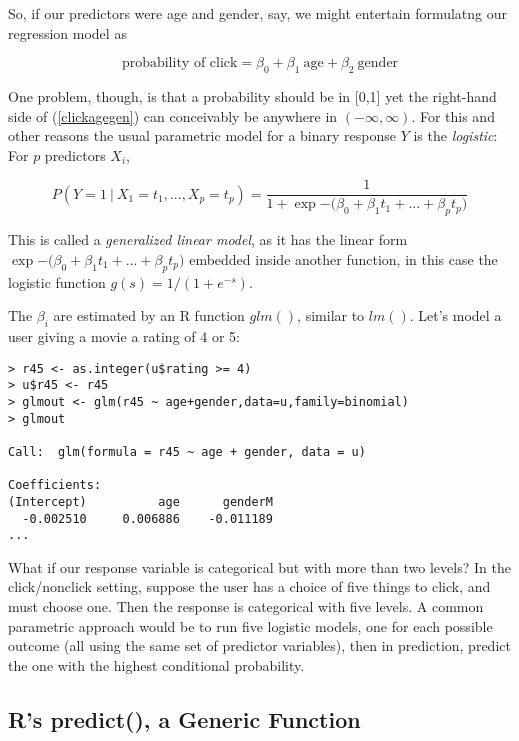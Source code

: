So, if our predictors were age and gender, say, we might entertain
formulatng our regression model as

\begin{equation}
\label{clickagegen}
\textrm{probability of click} = \beta_0 + \beta_1 ~ \textrm{age} +
\beta_2 ~ \textrm{gender}
\end{equation}

One problem, though, is that a probability should be in [0,1] yet the
right-hand side of (\ref{clickagegen}) can conceivably be anywhere in
$(-\infty,\infty)$.  For this and other reasons the usual parametric
model for a binary response $Y$ is the \textit{logistic}:  For $p$
predictors $X_i$, 

\begin{equation}
P(Y  = 1 ~|~ X_1=t_1,...,X_p=t_p) =
\frac{1}{1+\exp{-(\beta_0+\beta_1 t_1+...+\beta_p t_p})}
\end{equation}

This is called a \textit{generalized linear model}, as it has the linear
form $\exp{-(\beta_0+\beta_1 t_1+...+\beta_p t_p})$ embedded inside
another function, in this case the logistic function $g(s) =
1/(1+e^{-s})$.

The $\beta_i$ are estimated by an R function $glm()$, similar to $lm()$.
Let's model a user giving a movie a rating of 4 or 5:

\begin{lstlisting}
> r45 <- as.integer(u$rating >= 4)
> u$r45 <- r45
> glmout <- glm(r45 ~ age+gender,data=u,family=binomial)
> glmout

Call:  glm(formula = r45 ~ age + gender, data = u)

Coefficients:
(Intercept)          age      genderM  
  -0.002510     0.006886    -0.011189  
...
\end{lstlisting}

What if our response variable is categorical but with more than two
levels?  In the click/nonclick setting, suppose the user has a choice of
five things to click, and must choose one.  Then the response is
categorical with five levels.  A common parametric approach would be to
run five logistic models, one for each possible outcome (all using the
same set of predictor variables), then in prediction, predict the one
with the highest conditional probability.

\subsection{R's predict(), a Generic Function}

